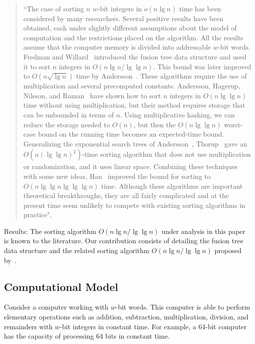 \documentclass[11pt]{article}
\begin{document}
\begin{quote}
``The case of sorting $n$ $w$-bit integers in $o(n\lg n)$ time has been considered by many researchers. Several positive results have been obtained, each under slightly different assumptions about the model of computation and the restrictions placed on the algorithm. All the results assume that the computer memory is divided into addressable $w$-bit words. Fredman and Willard~\cite{fredman} introduced the fusion tree data structure and used it to sort $n$ integers in $O(n\lg n/\lg\lg n)$. This bound was later improved to $O(n\sqrt{\lg n})$ time by Andersson~\cite{arne1}. These algorithms require the use of multiplication and several precomputed constants. Andersson, Hagerup, Nilsson, and Raman~\cite{arne2} have shown how to sort $n$ integers in $O(n\lg\lg n) $ time without using multiplication, but their method requires storage that can be unbounded in terms of $n$. Using multiplicative hashing, we can reduce the storage needed to $O(n)$, but then the $O(n\lg\lg n)$  worst-case bound on the running time becomes an expected-time bound. Generalizing the exponential search trees of Andersson~\cite{arne1}, Thorup~\cite{thorup} gave an $O(n(\lg\lg n)^2)$-time sorting algorithm that does not use multiplication or randomization, and it uses linear space. Combining these techniques with some new ideas, 
Han~\cite{han} improved the bound for sorting to $O(n\lg\lg n\lg\lg\lg n)$ time. Although these algorithms are important theoretical breakthroughs, they are all fairly complicated and at the present time seem unlikely to compete with existing sorting algorithms in practice".
\end{quote}


Results: The sorting algorithm $O(n\lg n/\lg\lg n)$ under analysis in this paper is known to the literature. Our contribution consists of detailing the fusion tree data structure and the related sorting algorithm $O(n\lg n/\lg\lg n)$ proposed 
by~\cite{fredman}. 







\subsection{Computational Model}


Consider a computer working with $w$-bit words. This computer is able to perform elementary operations such as addition, subtraction, multiplication, division, and remainders with $w$-bit integers in constant time. For example, a 64-bit computer has the capacity of processing 64 bits in constant time.
\end{document}
